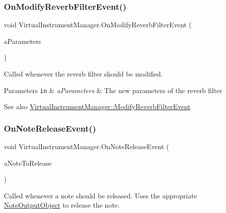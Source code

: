 \subsubsection{\texorpdfstring{On\+Modify\+Reverb\+Filter\+Event()}{OnModifyReverbFilterEvent()}}
{\footnotesize\ttfamily void Virtual\+Instrument\+Manager.\+On\+Modify\+Reverb\+Filter\+Event (\begin{DoxyParamCaption}\item[{\hyperlink{group___virtual_instrument_manager_event_types_struct_virtual_instrument_manager_1_1_reverb_filter_parameters}{Reverb\+Filter\+Parameters}}]{a\+Parameters }\end{DoxyParamCaption})}



Called whenever the reverb filter should be modified. 


\begin{DoxyParams}[1]{Parameters}
\mbox{\tt in}  & {\em a\+Parameters} & The new parameters of the reverb filter\\
\hline
\end{DoxyParams}
\begin{DoxySeeAlso}{See also}
\hyperlink{class_virtual_instrument_manager_1_1_modify_reverb_filter_event}{Virtual\+Instrument\+Manager\+::\+Modify\+Reverb\+Filter\+Event} 
\end{DoxySeeAlso}
\mbox{\label{group___virtual_instrument_manager_event_types_gadae914ac99141bc37853d3c536c3943a}} 
\subsubsection{\texorpdfstring{On\+Note\+Release\+Event()}{OnNoteReleaseEvent()}}
{\footnotesize\ttfamily void Virtual\+Instrument\+Manager.\+On\+Note\+Release\+Event (\begin{DoxyParamCaption}\item[{Music.\+P\+I\+T\+CH}]{a\+Note\+To\+Release }\end{DoxyParamCaption})}



Called whenever a note should be released. Uses the appropriate \hyperlink{class_note_output_object}{Note\+Output\+Object} to release the note. 


